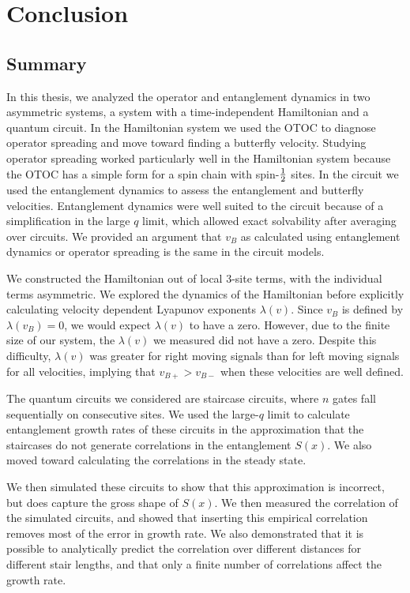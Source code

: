 \section{Conclusion} 

\subsection{Summary} \label{sub:sum}

In this thesis, we analyzed the operator and entanglement dynamics in two asymmetric systems, a system with a time-independent Hamiltonian and a quantum circuit. In the Hamiltonian system we used the OTOC to diagnose operator spreading and move toward finding a butterfly velocity. Studying operator spreading worked particularly well in the Hamiltonian system because the OTOC has a simple form for a spin chain with spin-$\frac{1}{2}$ sites. In the circuit we used the entanglement dynamics to assess the entanglement and butterfly velocities. Entanglement dynamics were well suited to the circuit because of a simplification in the large $q$ limit, which allowed exact solvability after averaging over circuits. We provided an argument that $v_B$ as calculated using entanglement dynamics or operator spreading is the same in the circuit models.

We constructed the Hamiltonian out of local 3-site terms, with the individual terms asymmetric. We explored the dynamics of the Hamiltonian before explicitly calculating velocity dependent Lyapunov exponents $\lambda(v)$. Since $v_B$ is defined by $\lambda(v_B)=0$, we would expect $\lambda(v)$ to have a zero. However, due to the finite size of our system, the $\lambda(v)$ we measured did not have a zero. Despite this difficulty, $\lambda(v)$ was greater for right moving signals than for left moving signals for all velocities, implying that $v_{B+}>v_{B-}$ when these velocities are well defined.

The quantum circuits we considered are staircase circuits, where $n$ gates fall sequentially on consecutive sites. We used the large-$q$ limit to calculate entanglement growth rates of these circuits in the approximation that the staircases do not generate correlations in the entanglement $S(x)$. We also moved toward calculating the correlations in the steady state.

We then simulated these circuits to show that this approximation is incorrect, but does capture the gross shape of $S(x)$. 
We then measured the correlation of the simulated circuits, and showed that inserting this empirical correlation removes most of the error in growth rate. We also demonstrated that it is possible to analytically predict the correlation over different distances for different stair lengths, and that only a finite number of correlations affect the growth rate.

